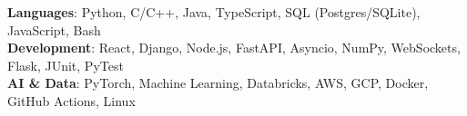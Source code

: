 \begin{itemize}[leftmargin=0.15in, label={}]
    \small{\item{
     \textbf{Languages}{: Python, C/C++, Java, TypeScript, SQL (Postgres/SQLite), JavaScript, Bash} \\
     \textbf{Development}{: React, Django, Node.js, FastAPI, Asyncio, NumPy, WebSockets, Flask, JUnit, PyTest} \\
     \textbf{AI \& Data}{: PyTorch, Machine Learning, Databricks, AWS, GCP, Docker, GitHub Actions, Linux}
    }}
\end{itemize}
